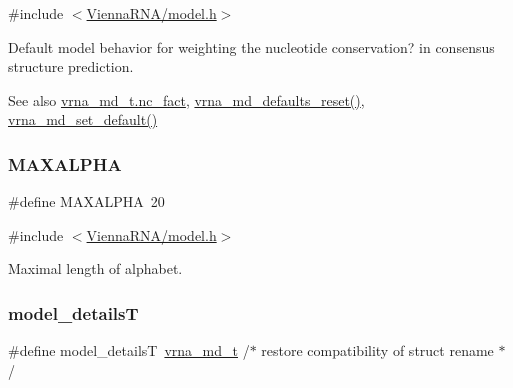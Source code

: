 {\ttfamily \#include $<$\mbox{\hyperlink{model_8h}{Vienna\+R\+N\+A/model.\+h}}$>$}



Default model behavior for weighting the nucleotide conservation? in consensus structure prediction. 

\begin{DoxySeeAlso}{See also}
\mbox{\hyperlink{group__model__details_abcf568e6124bfcb2f847ff4eb0dfded6}{vrna\+\_\+md\+\_\+t.\+nc\+\_\+fact}}, \mbox{\hyperlink{group__model__details_ga70834424cf804d149937de89f80ceb45}{vrna\+\_\+md\+\_\+defaults\+\_\+reset()}}, \mbox{\hyperlink{group__model__details_ga8ac6ff84936282436f822644bf841f66}{vrna\+\_\+md\+\_\+set\+\_\+default()}} 
\end{DoxySeeAlso}
\mbox{\label{group__model__details_ga05a5ffe718aa431d97419a12fb082379}} 
\subsubsection{\texorpdfstring{M\+A\+X\+A\+L\+P\+HA}{MAXALPHA}}
{\footnotesize\ttfamily \#define M\+A\+X\+A\+L\+P\+HA~20}



{\ttfamily \#include $<$\mbox{\hyperlink{model_8h}{Vienna\+R\+N\+A/model.\+h}}$>$}



Maximal length of alphabet. 

\mbox{\label{group__model__details_ga590b5539f4560d5b02e24db8d3ed1977}} 
\subsubsection{\texorpdfstring{model\+\_\+detailsT}{model\_detailsT}}
{\footnotesize\ttfamily \#define model\+\_\+detailsT~\mbox{\hyperlink{group__model__details_ga1f8a10e12a0a1915f2a4eff0b28ea17c}{vrna\+\_\+md\+\_\+t}}               /$\ast$ restore compatibility of struct rename $\ast$/}



